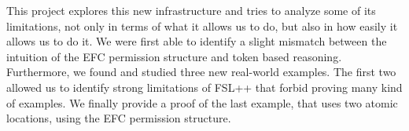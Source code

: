 This project explores this new infrastructure and tries to analyze some of its limitations, not only in terms of what it allows us to do, but also in how easily it allows us to do it. We were first able to identify a slight mismatch between the intuition of the EFC permission structure and token based reasoning. Furthermore, we found and studied three new real-world examples. The first two allowed us to identify strong limitations of FSL++ that forbid proving many kind of examples. We finally provide a proof of the last example, that uses two atomic locations, using the EFC permission structure. 
